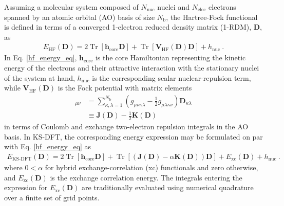 \documentclass[journal=jctc,manuscript=article]{achemso}
\DeclareMathOperator{\tr}{Tr}
\begin{document}
Assuming a molecular system composed of $N_{\text{nuc}}$ nuclei and $N_{\text{elec}}$ electrons spanned by an atomic orbital (AO) basis of size $N_{\text{b}}$, the Hartree-Fock functional is defined in terms of a converged 1-electron reduced density matrix (1-RDM), $\bm{D}$, as~\cite{mest}
%
\begin{align}
E_{\text{HF}}(\bm{D}) = 2\tr[\bm{h}_{\text{core}}\bm{D}] + \tr[\bm{V}_{\text{HF}}(\bm{D})\bm{D}] + h_{\text{nuc}} \ . \label{hf_energy_eq}
\end{align}
%
In Eq. \ref{hf_energy_eq}, $\bm{h}_{\text{core}}$ is the core Hamiltonian representing the kinetic energy of the electrons and their attractive interaction with the stationary nuclei of the system at hand, $h_{\text{nuc}}$ is the corresponding scalar nuclear-repulsion term, while $\bm{V}_{\text{HF}}(\bm{D})$ is the Fock potential with matrix elements
%
\begin{align}
[\bm{V}_{\text{HF}}(\bm{D})]_{\mu\nu} &= \sum^{N_{\text{b}}}_{\kappa,\lambda=1}(g_{\mu\nu\kappa\lambda} - \tfrac{1}{2}g_{\mu\lambda\kappa\nu})\bm{D}_{\kappa\lambda} \nonumber \\
&\equiv \bm{J}(\bm{D}) - \tfrac{1}{2}\bm{K}(\bm{D}) \label{fock_potential_eq}
\end{align}
%
in terms of Coulomb and exchange two-electron repulsion integrals in the AO basis. In KS-DFT, the corresponding energy expression may be formulated on par with Eq. \ref{hf_energy_eq} as
%
\begin{align}
E_{\text{KS-DFT}}(\bm{D}) = 2\tr[\bm{h}_{\text{core}}\bm{D}] + \tr[(\bm{J}(\bm{D}) - \alpha\bm{K}(\bm{D}))\bm{D}] + E_{\text{xc}}(\bm{D}) + h_{\text{nuc}} \ . \label{ks_dft_energy_eq}
\end{align}
%
where $0 < \alpha$ for hybrid exchange-correlation (xc) functionals and zero otherwise, and $E_{\text{xc}}(\bm{D})$ is the exchange correlation energy. The integrals entering the expression for $E_{\text{xc}}(\bm{D})$ are traditionally evaluated using numerical quadrature over a finite set of grid points.\\
\end{document}
